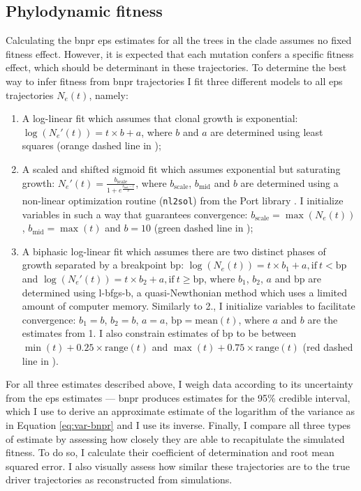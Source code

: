 \subsection{Phylodynamic fitness}

Calculating the \ac{bnpr} \ac{eps} estimates for all the trees in the clade assumes no fixed fitness effect. However, it is expected that each mutation confers a specific fitness effect, which should be determinant in these trajectories. To determine the best way to infer fitness from \ac{bnpr} trajectories I fit three different models to all \ac{eps} trajectories $N_e(t)$, namely:

\begin{enumerate}
    \item A log-linear fit which assumes that clonal growth is exponential: $\log(N_e'(t)) = t \times b + a$, where $b$ and $a$ are determined using least squares (orange dashed line in );
    \item A scaled and shifted sigmoid fit which assumes exponential but saturating growth: $N_e'(t) = \frac{b_{\mathrm{scale}}}{1+e^{\frac{b_{\mathrm{mid}}-t}{b}}}$, where $b_{\mathrm{scale}}$, $b_{\mathrm{mid}}$ and $b$ are determined using a non-linear optimization routine (\texttt{nl2sol}) from the Port library \cite{noauthor_undated-gs}. I initialize variables in such a way that guarantees convergence: $b_{\mathrm{scale}}=\max(N_e(t))$, $b_{\mathrm{mid}}=\max(t)$ and $b=10$ (green dashed line in );
    \item A biphasic log-linear fit which assumes there are two distinct phases of growth separated by a breakpoint $\mathrm{bp}$: $\log(N_e(t)) = t \times b_1 + a, \mathrm{if}\ t < \mathrm{bp}$ and $\log(N_e'(t)) = t \times b_2 + a, \mathrm{if}\ t \geq \mathrm{bp}$, where $b_1$, $b_2$, $a$ and $\mathrm{bp}$ are determined using \ac{l-bfgs-b}, a quasi-Newthonian method which uses a limited amount of computer memory. Similarly to 2., I initialize variables to facilitate convergence: $b_1=b$, $b_2=b$, $a=a$, $\mathrm{bp}=\mathrm{mean}(t)$, where $a$ and $b$ are the estimates from 1. I also constrain estimates of $\mathrm{bp}$ to be between $\min(t) + 0.25 \times \mathrm{range}(t)$ and $\max(t) + 0.75 \times \mathrm{range}(t)$ (red dashed line in ).
\end{enumerate}

For all three estimates described above, I weigh data according to its uncertainty from the \ac{eps} estimates --- \ac{bnpr} produces estimates for the 95\% credible interval, which I use to derive an approximate estimate of the logarithm of the variance as in Equation \eqref{eq:var-bnpr} and I use its inverse. Finally, I compare all three types of estimate by assessing how closely they are able to recapitulate the simulated fitness. To do so, I calculate their coefficient of determination and root mean squared error. I also visually assess how similar these trajectories are to the true driver trajectories as reconstructed from simulations.

